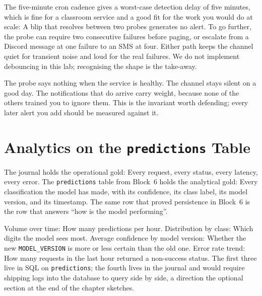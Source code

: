 The five-minute cron cadence gives a worst-case detection delay of
five minutes, which is fine for a classroom service and a good fit for
the work you would do at scale: A blip that resolves between two probes
generates no alert. To go further, the probe can require two consecutive
failures before paging, or escalate from a Discord message at one
failure to an SMS at four. Either path keeps the channel quiet for
transient noise and loud for the real failures. We do not implement
debouncing in this lab; recognising the shape is the take-away.

The probe says nothing when the service is healthy. The channel stays
silent on a good day. The notifications that do arrive carry weight,
because none of the others trained you to ignore them. This is the
invariant worth defending; every later alert you add should be measured
against it.



\newpage
\section{Analytics on the \texttt{predictions} Table}

The journal holds the operational gold: Every request, every status,
every latency, every error. The \texttt{predictions} table from
Block~6 holds the analytical gold: Every classification the model has
made, with its confidence, its class label, its model version, and its
timestamp. The same row that proved persistence in Block~6 is the row
that answers ``how is the model performing''.


Volume over time: How many predictions per hour. Distribution by
class: Which digits the model sees most. Average confidence by model
version: Whether the new \texttt{MODEL\_VERSION} is more or less
certain than the old one. Error rate trend: How many requests in the
last hour returned a non-success status. The first three live in SQL
on \texttt{predictions}; the fourth lives in the journal and would
require shipping logs into the database to query side by side, a
direction the optional section at the end of the chapter sketches.

